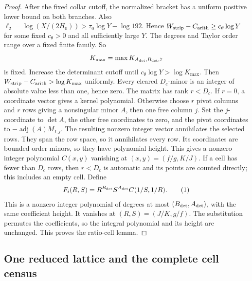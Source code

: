 \begin{proof}
After the fixed collar cutoff, the normalized bracket has a uniform
positive lower bound on both branches. Also
\(\ell_2=\log(X/(2H_0))>\tau_0\log Y-\log192\). Hence
\(W_{\rm strip}-C_{\rm arith}\ge c_\theta\log Y\) for some fixed
\(c_\theta>0\) and all sufficiently large \(Y\). The degrees and
Taylor order range over a fixed finite family. So
\[
 K_{\max}=\max K_{A_{\rm det},B_{\rm det},7}
\]
is fixed. Increase the determinant cutoff until
\(c_\theta\log Y>\log K_{\max}\). Then
\(W_{\rm strip}-C_{\rm arith}>\log K_{\max}\) uniformly. Every
cleared \(D_c\)-minor is an integer of absolute value less than one,
hence zero. The matrix has rank \(r<D_c\). If \(r=0\),
a coordinate vector gives a kernel polynomial. Otherwise choose \(r\)
pivot columns and \(r\) rows giving a nonsingular minor \(A\), then one
free column \(j\). Set the \(j\)-coordinate to \(\det A\), the other
free coordinates to zero, and the pivot coordinates to
\(-\operatorname{adj}(A)M_{I,j}\). The resulting nonzero integer vector
annihilates the selected rows. They span the row space, so it annihilates
every row. Its coordinates are bounded-order minors, so they have
polynomial height. This gives a nonzero integer polynomial \(C(x,y)\)
vanishing at
\((x,y)=(f/g,K/J)\). If a cell has fewer than \(D_c\) rows, then
\(r<D_c\) is automatic and its points are counted directly; this includes
an empty cell. Define
\[
 F_i(R,S)=R^{B_{\rm det}}S^{A_{\rm det}}C(1/S,1/R).
\AutoTag{eq:old:7_10h}
\]
This is a nonzero integer polynomial of degrees at most
\((B_{\rm det},A_{\rm det})\), with
the same coefficient height. It vanishes at
\((R,S)=(J/K,g/f)\). The substitution permutes the coefficients, so the
integral polynomial and its height are unchanged. This proves the
ratio-cell lemma.
\end{proof}

\subsection{One reduced lattice and the complete cell census}

